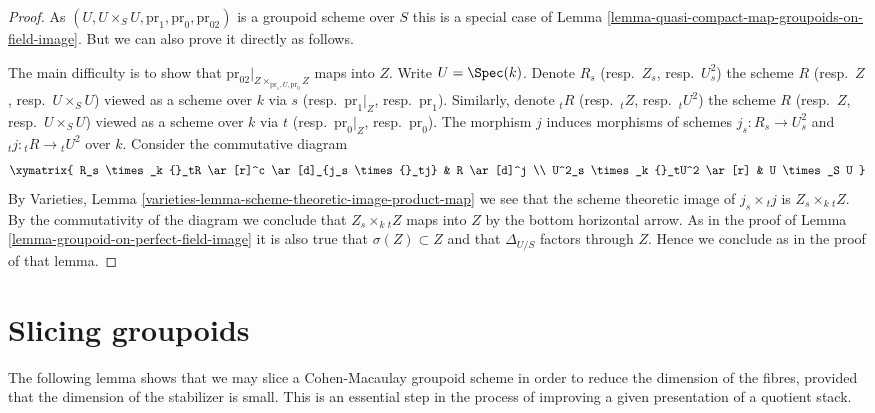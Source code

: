 \begin{proof}
As $(U, U \times_S U, \text{pr}_1, \text{pr}_0, \text{pr}_{02})$
is a groupoid scheme over $S$ this is a special case of
Lemma \ref{lemma-quasi-compact-map-groupoids-on-field-image}.
But we can also prove it directly as follows.

\medskip\noindent
The main difficulty is to show that
$\text{pr}_{02}|_{Z \times_{\text{pr}_1, U, \text{pr}_0} Z}$
maps into $Z$.
Write $U = \Spec(k)$. Denote
$R_s$ (resp.\ $Z_s$, resp.\ $U^2_s$) the scheme
$R$ (resp.\ $Z$, resp.\ $U \times_S U$) viewed as a scheme over $k$ via
$s$ (resp.\ $\text{pr}_1|_Z$, resp.\ $\text{pr}_1$).
Similarly, denote
${}_tR$ (resp.\ ${}_tZ$, resp.\ ${}_tU^2$) the scheme
$R$ (resp.\ $Z$, resp.\ $U \times_S U$) viewed as a scheme over $k$ via
$t$ (resp.\ $\text{pr}_0|_Z$, resp.\ $\text{pr}_0$).
The morphism $j$ induces morphisms of schemes
$j_s : R_s \to U^2_s$ and ${}_tj : {}_tR \to {}_tU^2$ over $k$.
Consider the commutative diagram
$$
\xymatrix{
R_s \times_k {}_tR \ar[r]^c \ar[d]_{j_s \times {}_tj} &  R \ar[d]^j \\
U^2_s \times_k {}_tU^2 \ar[r] & U \times_S U
}
$$
By
Varieties, Lemma \ref{varieties-lemma-scheme-theoretic-image-product-map}
we see that the scheme theoretic image of $j_s \times {}_tj$ is
$Z_s \times_k {}_tZ$. By the commutativity of the diagram we
conclude that $Z_s \times_k {}_tZ$ maps into $Z$ by the bottom
horizontal arrow. As in the proof of
Lemma \ref{lemma-groupoid-on-perfect-field-image}
it is also true that $\sigma(Z) \subset Z$ and that
$\Delta_{U/S}$ factors through $Z$. Hence we conclude as in the
proof of that lemma.
\end{proof}







\section{Slicing groupoids}
\label{section-slicing}

\noindent
The following lemma shows that we may slice a Cohen-Macaulay groupoid scheme
in order to reduce the dimension of the fibres, provided that the
dimension of the stabilizer is small. This is an essential step in
the process of improving a given presentation of a quotient stack.

